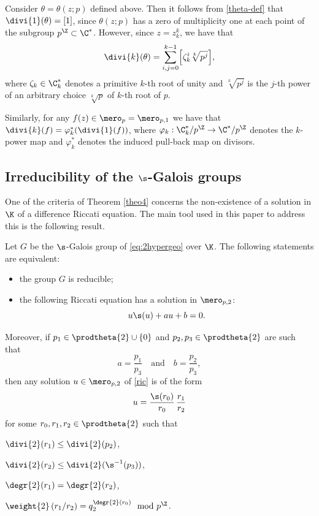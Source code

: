 \begin{example} \label{theta-div-eg} Consider $\theta=\theta(z;p)$ defined above. Then it follows from \eqref{theta-def} that $\divi{1}(\theta)=[1]$, since $\theta(z;p)$ has a zero of multiplicity one at each point of the subgroup $p^\Z\subset \C^{*}$. However, since $z=z_k^k$, we have that
\[
\divi{k}(\theta)=\sum_{i,j=0}^{k-1}\Bigl[\zeta_k^i\sqrt[k]{p^j}\Bigr],
\]
where $\zeta_k\in\C^{*}_k$ denotes a primitive $k$-th root of unity and $\sqrt[k]{p^j}$ is the $j$-th power of an arbitrary choice $\sqrt[k]{p}$ of $k$-th root of $p$.

Similarly, for any $f(z)\in\mero_p=\mero_{p,1}$ we have that $\divi{k}(f)=\varphi_k^{*}(\divi{1}(f))$, where $\varphi_k:\C_k^{*}/p^\Z\to \C^{*}/p^\Z$ denotes the $k$-power map and $\varphi_k^{*}$ denotes the induced pull-back map on divisors.
\end{example}

\subsection{Irreducibility of the $\s$-Galois groups}

One of the criteria of Theorem \ref{theo4} concerns the non-existence of a solution in $\K$ of a difference Riccati equation. The main tool used in this paper to address this is the following result.

\begin{theo}\label{theo1}
Let $G$ be the $\s$-Galois group of \eqref{eq:2hypergeo} over $\K$. The following statements are equivalent:
\begin{itemize}
\item the group $G$ is reducible;
\item the following Riccati equation has a solution in $\mero_{p,2}$:
\begin{equation}\label{ric}
u\s (u)+au+b=0.
\end{equation}
\end{itemize}
Moreover, if $p_{1} \in \prodtheta{2} \cup \{0\}$ and $p_{2},p_{3} \in \prodtheta{2}$ are such that
\[
a = \frac{p_{1}}{p_{3}} \quad\text{and}\quad b = \frac{p_{2}}{p_{3}},
\]
then any solution $u \in \mero_{p,2}$ of \eqref{ric} is of the form
\[
u = \frac{\s (r_{0})}{r_{0}}\,\frac{r_{1}}{r_{2}}
\]
for some $r_{0},r_{1},r_{2}\in \prodtheta{2}$ such that
\begin{enumeratei}
\item\label{theo1i}
$\divi{2} (r_{1}) \leq \divi{2} (p_{2})$,
\item\label{theo1ii}
$\divi{2} (r_{2}) \leq \divi{2} (\s^{-1}(p_{3}))$,
\item\label{theo1iii}
$\degr{2} (r_{1})=\degr{2} (r_{2})$,
\item\label{theo1iv}
$\weight{2} \left(r_{1}/r_{2}\right)= q_2^{\degr{2} (r_{0})} \mod p^\Z$.
\end{enumeratei}
\end{theo}

